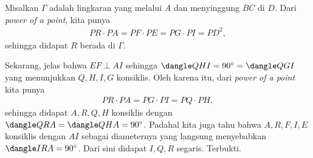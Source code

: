     Misalkan $\Gamma$ adalah lingkaran yang melalui $A$ dan menyinggung $BC$ di $D$. Dari \textit{power of a point}, kita punya
    \begin{align*}
        PR \cdot PA = PF \cdot PE = PG \cdot PI = PD^2,
    \end{align*}
    sehingga didapat $R$ berada di $\Gamma$.

    Sekarang, jelas bahwa $EF \perp AI$ sehingga $\dangle QHI = 90^\circ = \dangle QGI$ yang menunjukkan $Q,H,I,G$ konsiklis. Oleh karena itu, dari \textit{power of a point} kita punya
    \begin{align*}
        PR \cdot PA = PG \cdot PI = PQ \cdot PH,
    \end{align*}
    sehingga didapat $A,R,Q,H$ konsiklis dengan $\dangle QRA = \dangle QHA = 90^\circ$. 
    Padahal kita juga tahu bahwa $A,R,F,I,E$ konsiklis dengan $AI$ sebagai diameternya yang langsung menyebabkan $\dangle IRA = 90^\circ$. Dari sini didapat $I,Q,R$ segaris. Terbukti.

\newpage
